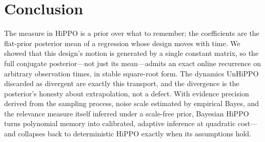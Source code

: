 \documentclass[11pt]{article}
\begin{document}
\section{Conclusion}

The measure in HiPPO is a prior over what to remember; the coefficients are the flat-prior posterior mean of a regression whose design moves with time. We showed that this design's motion is generated by a single constant matrix, so the full conjugate posterior---not just its mean---admits an exact online recurrence on arbitrary observation times, in stable square-root form. The dynamics UnHiPPO discarded as divergent are exactly this transport, and the divergence is the posterior's honesty about extrapolation, not a defect. With evidence precision derived from the sampling process, noise scale estimated by empirical Bayes, and the relevance measure itself inferred under a scale-free prior, Bayesian HiPPO turns polynomial memory into calibrated, adaptive inference at quadratic cost---and collapses back to deterministic HiPPO exactly when its assumptions hold.
\end{document}
